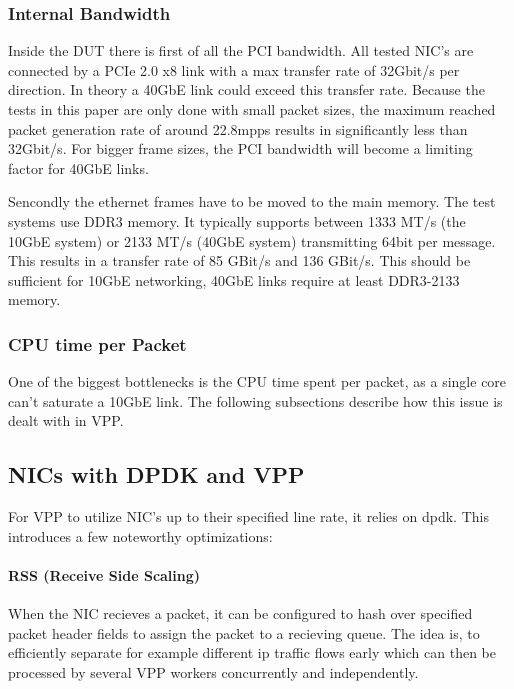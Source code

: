 \subsubsection{Internal Bandwidth}


Inside the DUT there is first of all the PCI bandwidth. All tested
NIC's are connected by a PCIe 2.0 x8 link with a max transfer rate of
32Gbit/s per direction. In theory a 40GbE link could exceed this
transfer rate. Because the tests in this paper are only done with
small packet sizes, the maximum reached packet generation rate of
around 22.8mpps results in significantly less than 32Gbit/s. For
bigger frame sizes, the PCI bandwidth will become a limiting factor
for 40GbE links.


Sencondly the ethernet frames have to be moved to the main memory. The
test systems use DDR3 memory. It typically supports between 1333 MT/s
(the 10GbE system) or 2133 MT/s (40GbE system) transmitting 64bit per
message. This results in a transfer rate of 85 GBit/s and 136 GBit/s.
This should be sufficient for 10GbE networking, 40GbE links
require at least DDR3-2133 memory. 

\subsubsection{CPU time per Packet}

One of the biggest bottlenecks is the CPU time spent per packet, as a
single core can't saturate a 10GbE link. The following subsections
describe how this issue is dealt with in VPP.




\subsection{NICs with DPDK and VPP}

For VPP to utilize NIC's up to their specified line rate, it relies on
\Ac{dpdk}. This introduces a few noteworthy optimizations:

\paragraph{RSS (Receive Side Scaling)}

When the NIC recieves a packet, it can be configured to hash over
specified packet header fields to assign the packet to a recieving
queue. The idea is, to efficiently separate for example different ip
traffic flows early which can then be processed by several VPP workers
concurrently and independently. \cite{linguaglossa2017high}

